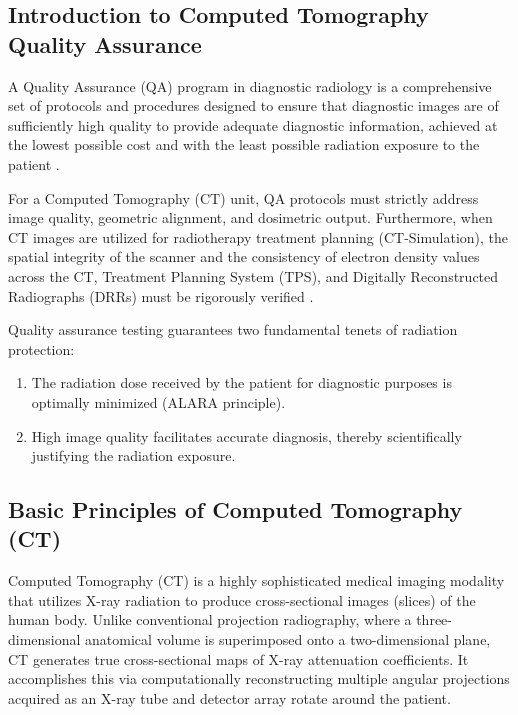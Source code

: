 \subsection{Introduction to Computed Tomography Quality Assurance}
A Quality Assurance (QA) program in diagnostic radiology is a comprehensive set of protocols and procedures designed to ensure that diagnostic images are of sufficiently high quality to provide adequate diagnostic information, achieved at the lowest possible cost and with the least possible radiation exposure to the patient \cite{bushberg2011essential}. 

For a Computed Tomography (CT) unit, QA protocols must strictly address image quality, geometric alignment, and dosimetric output. Furthermore, when CT images are utilized for radiotherapy treatment planning (CT-Simulation), the spatial integrity of the scanner and the consistency of electron density values across the CT, Treatment Planning System (TPS), and Digitally Reconstructed Radiographs (DRRs) must be rigorously verified \cite{aapm66}. 

Quality assurance testing guarantees two fundamental tenets of radiation protection:
\begin{enumerate}
    \item The radiation dose received by the patient for diagnostic purposes is optimally minimized (ALARA principle).
    \item High image quality facilitates accurate diagnosis, thereby scientifically justifying the radiation exposure.
\end{enumerate}

\subsection{Basic Principles of Computed Tomography (CT)}
Computed Tomography (CT) is a highly sophisticated medical imaging modality that utilizes X-ray radiation to produce cross-sectional images (slices) of the human body. Unlike conventional projection radiography, where a three-dimensional anatomical volume is superimposed onto a two-dimensional plane, CT generates true cross-sectional maps of X-ray attenuation coefficients. It accomplishes this via computationally reconstructing multiple angular projections acquired as an X-ray tube and detector array rotate around the patient.

